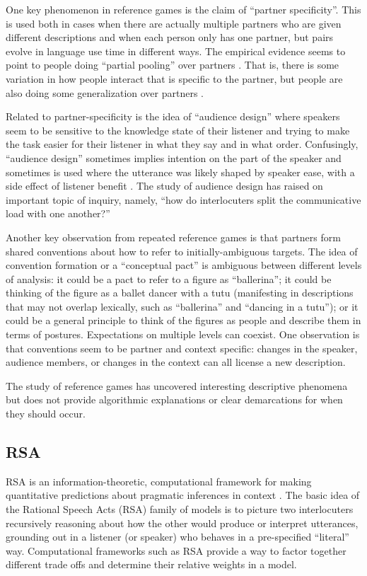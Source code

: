 \documentclass[]{article}
\begin{document}
One key phenomenon in reference games is the claim of ``partner specificity''. This is used both in cases when there are actually multiple partners who are given different descriptions and when each person only has one partner, but pairs evolve in language use time in different ways. The empirical evidence seems to point to people doing ``partial pooling'' over partners \cite{hawkins2021}. That is, there is some variation in how people interact that is specific to the partner, but people are also doing some generalization over partners \cite{yoon2014}. 

Related to partner-specificity is the idea of ``audience design'' where speakers seem to be sensitive to the knowledge state of their listener and trying to make the task easier for their listener in what they say and in what order. Confusingly, ``audience design'' sometimes implies intention on the part of the speaker and sometimes is used where the utterance was likely shaped by speaker ease, with a side effect of listener benefit \cite{horton1996, rogers2013}. The study of audience design has raised on important topic of inquiry, namely, ``how do interlocuters split the communicative load with one another?''

Another key observation from repeated reference games is that partners form shared conventions about how to refer to initially-ambiguous targets. The idea of convention formation or a ``conceptual pact'' is ambiguous between different levels of analysis: it could be a pact to refer to a figure as ``ballerina''; it could be thinking of the figure as a ballet dancer with a tutu (manifesting in descriptions that may not overlap lexically, such as ``ballerina'' and ``dancing in a tutu''); or it could be a general principle to think of the figures as people and describe them in terms of postures. Expectations on multiple levels can coexist. One observation is that conventions seem to be partner and context specific: changes in the speaker, audience members, or changes in the context can all license a new description. 

The study of reference games has uncovered interesting descriptive phenomena but does not provide algorithmic explanations or clear demarcations for when they should occur. 

\subsection{RSA}

RSA is an information-theoretic, computational framework for making quantitative predictions about pragmatic inferences in context \cite{goodman2016, frank2012a}. The basic idea of the Rational Speech Acts (RSA) family of models is to picture two interlocuters recursively reasoning about how the other would produce or interpret utterances, grounding out in a listener (or speaker) who behaves in a pre-specified ``literal'' way. Computational frameworks such as RSA provide a way to factor together different trade offs and determine their relative weights in a model. 
\end{document}
